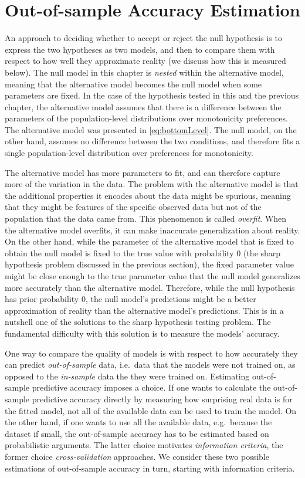 \documentclass[a4paper,12pt,twoside]{article}
\begin{document}
\section{Out-of-sample Accuracy Estimation}\label{sec:accuracyEstimation}

An approach to deciding whether to accept or reject the null hypothesis is to express the two hypotheses as two models, and then to compare them with respect to how well they approximate reality (we discuss how this is measured below). The null model in this chapter is \textit{nested} within the alternative model, meaning that the alternative model becomes the null model when some parameters are fixed. In the case of the hypothesis tested in this and the previous chapter, the alternative model assumes that there is a difference between the parameters of the population-level distributions over monotonicity preferences. The alternative model was presented in \ref{eq:bottomLevel}. The null model, on the other hand, assumes no difference between the two conditions, and therefore fits a single population-level distribution over preferences for monotonicity.

The alternative model has more parameters to fit, and can therefore capture more of the variation in the data. The problem with the alternative model is that the additional properties it encodes about the data might be spurious, meaning that they might be features of the specific observed data but not of the population that the data came from. This phenomenon is called \textit{overfit}. When the alternative model overfits, it can make inaccurate generalization about reality. On the other hand, while the parameter of the alternative model that is fixed to obtain the null model is fixed to the true value with probability 0 (the sharp hypothesis problem discussed in the previous section), the fixed parameter value might be close enough to the true parameter value that the null model generalizes more accurately than the alternative model. Therefore, while the null hypothesis has prior probability 0, the null model's predictions might be a better approximation of reality than the alternative model's predictions. This is in a nutshell one of the solutions to the sharp hypothesis testing problem. The fundamental difficulty with this solution is to measure the models' accuracy.

One way to compare the quality of models is with respect to how accurately they can predict \textit{out-of-sample} data, i.e.\ data that the models were not trained on, as opposed to the \textit{in-sample} data the they were trained on. Estimating out-of-sample predictive accuracy imposes a choice. If one wants to calculate the out-of-sample predictive accuracy directly by measuring how surprising real data is for the fitted model, not all of the available data can be used to train the model. On the other hand, if one wants to use all the available data, e.g.\ because the dataset if small, the out-of-sample accuracy has to be estimated based on probabilistic arguments. The latter choice motivates \textit{information criteria}, the former choice \textit{cross-validation} approaches. We consider these two possible estimations of out-of-sample accuracy in turn, starting with information criteria.
\end{document}
